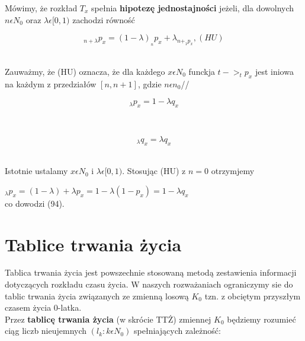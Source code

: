 \documentclass{article}
\begin{document}
Mówimy, że rozkład $ T_x $ spełnia \textbf{hipotezę jednostajności} jeżeli, dla dowolnych $ n \epsilon N_0 $ oraz $ \lambda \epsilon [0,1) $ zachodzi równość\\

\begin{center}
	\begin{equation}
		_{n+\lambda}p_x = (1-\lambda)__np_x + \lambda_{n+_1p_x}, (HU)
	\end{equation}
\end{center}\\

Zauważmy, że (HU) oznacza, że dla każdego $ x \epsilon N_0 $ funckja $ t->_t p_x $ jest iniowa na każdym z przedziałów $ [n, n+1] $, gdzie $ n \epsilon n_0 $//

 \begin{center}
	\begin{equation}
		_{\lambda}p_x = 1 - \lambda q_x
	\end{equation}
\end{center}\\

\begin{center}
	\begin{equation}
		_{\lambda}q_x = \lambda q_x
	\end{equation}
\end{center}\\

Istotnie ustalamy $ x \epsilon N_0 $ i $ \lambda \epsilon [0,1) $. Stosując (HU) z $ n=0 $ otrzymjemy\

$ _{\lambda}p_x = (1 - \lambda) + \lambda p_x = 1 - \lambda (1 - p_x) = 1 - \lambda q_x $\\

co dowodzi (94).\\

\newpage

\section{Tablice trwania życia}

Tablica trwania życia jest powszechnie stosowaną metodą zestawienia informacji dotyczących rozkładu czasu życia. W naszych rozważaniach ograniczymy sie do tablic trwania życia związanych ze zmienną losową $ K_0 $ tzn. z obciętym przyszłym czasem życia 0-latka.\\

Przez \textbf{tablicę trwania życia} (w skrócie TTŻ) zmiennej $ K_0 $ będziemy rozumieć ciąg liczb nieujemnych $ (l_k : k \epsilon N_0) $ spełniających zależność: 
\end{document}
